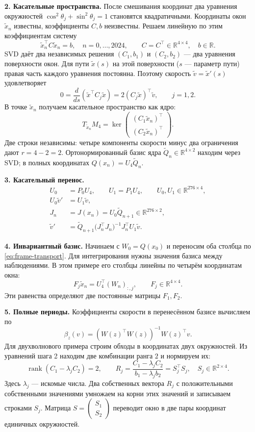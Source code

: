 \documentclass[11pt,a4paper]{article}
\begin{document}
\textbf{2. Касательные пространства.}
После смешивания координат два уравнения окружностей
$\cos^2\theta_j+\sin^2\theta_j=1$ становятся квадратичными.
Координаты окон $\widetilde x_n$ известны, коэффициенты $C,b$ неизвестны.
Решаем линейную по этим коэффициентам систему
$$
\widetilde x_n^\top C\widetilde x_n=b,\quad n=0,\ldots,2024,
\qquad C=C^\top\in\mathbb R^{4\times4},\quad b\in\mathbb R.
$$
SVD даёт два независимых решения $(C_1,b_1)$ и $(C_2,b_2)$ ---
два уравнения поверхности окон.
Для пути $\widetilde x(s)$ на этой поверхности ($s$ --- параметр пути)
правая часть каждого уравнения постоянна. Поэтому скорость $\widetilde v=\widetilde x'(s)$ удовлетворяет
$$
0=\frac{d}{ds}(\widetilde x^\top C_j\widetilde x)
=2(C_j\widetilde x)^\top\widetilde v,\qquad j=1,2.
$$
В точке $\widetilde x_n$ получаем касательное пространство как ядро:
$$
T_{\widetilde x_n}M_4=
\ker\begin{pmatrix}(C_1\widetilde x_n)^\top\\(C_2\widetilde x_n)^\top\end{pmatrix}.
$$
Две строки независимы: четыре компоненты скорости минус два ограничения
дают $r=4-2=2$. Ортонормированный базис ядра
$\widetilde Q_n\in\mathbb R^{4\times2}$ находим через SVD;
в полных координатах $Q(x_n)=U_4\widetilde Q_n$.

\textbf{3. Касательный перенос.}
$$
\begin{aligned}
U_0&=P_0U_4,\qquad U_1=P_1U_4,\qquad U_0,U_1\in\mathbb R^{276\times4},\\
U_0\widetilde v'&=U_1\widetilde v,\\
J_n&=J(x_n)=U_0\widetilde Q_{n+1}\in\mathbb R^{276\times2},\\
\widetilde v'&=\widetilde Q_{n+1}
\bigl(J_n^\top J_n\bigr)^{-1}J_n^\top U_1\widetilde v.
\end{aligned}
$$

\textbf{4. Инвариантный базис.}
Начинаем с $W_0=Q(x_0)$ и переносим оба столбца по \eqref{eq:frame-transport}.
Для интегрирования нужны значения базиса между наблюдениями.
В этом примере его столбцы линейны по четырём координатам окна:
$$
F_j\widetilde x_n=U_4^\top(W_n)_{:,j},\qquad F_j\in\mathbb R^{4\times4}.
$$
Эти равенства определяют две постоянные матрицы $F_1,F_2$.

\textbf{5. Полные периоды.}
Коэффициенты скорости в перенесённом базисе вычисляем по
$$
\beta_z(v)=(W(z)^\top W(z))^{-1}W(z)^\top v.
$$
Для двухволнового примера строим обходы в координатах двух окружностей.
Из уравнений шага 2 находим две комбинации ранга $2$ и нормируем их:
$$
\operatorname{rank}(C_1-\lambda_jC_2)=2,\qquad
R_j=\frac{C_1-\lambda_jC_2}{b_1-\lambda_jb_2}=S_j^\top S_j,
\quad S_j\in\mathbb R^{2\times4}.
$$
Здесь $\lambda_j$ --- искомые числа. Два собственных вектора $R_j$
с положительными собственными значениями умножаем на корни этих значений
и записываем строками $S_j$.
Матрица $S=\begin{pmatrix}S_1\\S_2\end{pmatrix}$ переводит окно в две пары
координат единичных окружностей.
\end{document}
